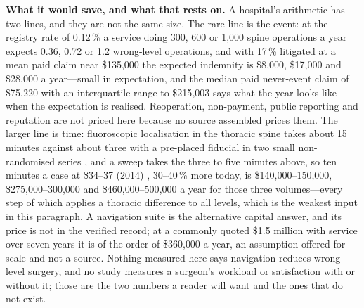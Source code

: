 \documentclass[11pt,letterpaper]{article}
\begin{document}
\textbf{What it would save, and what that rests on.} A hospital's arithmetic has two lines, and they are not
the same size. The rare line is the event: at the registry rate of 0.12\,\% \citep{furuya2026} a service
doing 300, 600 or 1{,}000 spine operations a year expects 0.36, 0.72 or 1.2 wrong-level operations, and
with 17\,\% litigated \citep{mody2008} at a mean paid claim near \$135{,}000 \citep{mehtsun2013,tan2023}
the expected indemnity is \$8{,}000, \$17{,}000 and \$28{,}000 a year---small in expectation, and the
median paid never-event claim of \$75{,}220 with an interquartile range to \$215{,}003 \citep{bettis2026}
says what the year looks like when the expectation is realised. Reoperation, non-payment, public
reporting and reputation are not priced here because no source assembled prices them. The larger line is
time: fluoroscopic localisation in the thoracic spine takes about 15 minutes against about three with
a pre-placed fiducial in two small non-randomised series \citep{mongardi2021,upadhyaya2012}, and a sweep
takes the three to five minutes above, so ten minutes a case at \$34--37 (2014) \citep{childers2018},
30--40\,\% more today, is \$140{,}000--150{,}000, \$275{,}000--300{,}000 and \$460{,}000--500{,}000 a
year for those three volumes---every step of which applies a thoracic difference to all levels, which is
the weakest input in this paragraph. A navigation suite is the alternative capital answer, and its price
is not in the verified record; at a commonly quoted \$1.5 million with service over seven years it is
of the order of \$360{,}000 a year, an assumption offered for scale and not a source. Nothing measured
here says navigation reduces wrong-level surgery, and no study measures a surgeon's workload or
satisfaction with or without it; those are the two numbers a reader will want and the ones that do not
exist.
\end{document}
